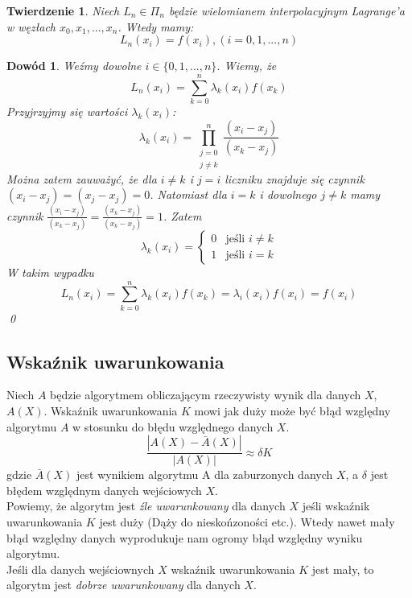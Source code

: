 \documentclass{article}
\newtheorem{twr}{Twierdzenie}
\newtheorem*{dd}{Dowód}
\newcommand{\twopartdef}[4]
{
	\left\{
		\begin{array}{ll}
			#1 & \mbox{jeśli } #2 \\
			#3 & \mbox{jeśli } #4
		\end{array}
	\right.
}
\begin{document}
\begin{twr}
Niech $L_n \in \Pi_n$ będzie wielomianem interpolacyjnym Lagrange'a w węzłach $x_0, x_1, ..., x_n$. Wtedy mamy:
\begin{equation*}
L_n(x_i) = f(x_i) , (i = 0, 1, ..., n)
\end{equation*}
\end{twr}

\begin{dd}
\normalfont
Weźmy dowolne $i \in \{0, 1, ..., n\}$. Wiemy, że
\begin{equation*}
L_n(x_i) = \sum_{k = 0}^n \lambda_k(x_i) f(x_k)
\end{equation*}
Przyjrzyjmy się wartości $\lambda_k(x_i)$:
\begin{equation*}
\lambda_k(x_i) = \prod_{\substack{j = 0 \\ j \neq k}}^n \frac{(x_i - x_j)}{(x_k - x_j)}
\end{equation*}
Można zatem zauważyć, że dla $i \neq k$ i $j = i$ liczniku znajduje się czynnik $(x_i - x_j) = (x_j - x_j) = 0$. Natomiast dla $i = k$ i dowolnego $j \neq k$ mamy czynnik $\frac{(x_i - x_j)}{(x_k - x_j)} = \frac{(x_k - x_j)}{(x_k - x_j)} = 1$. Zatem
\begin{equation*}
\lambda_k(x_i) = \twopartdef {0} {i \neq k} {1} {i = k}
\end{equation*}
W takim wypadku
\begin{equation*}
L_n(x_i) = \sum_{k = 0}^n \lambda_k(x_i) f(x_k) = \lambda_i(x_i) f(x_i) = f(x_i)
\end{equation*}
\qed
\end{dd}

\subsection{Wskaźnik uwarunkowania}
Niech $A$ będzie algorytmem obliczającym rzeczywisty wynik dla danych $X$, $A(X)$. Wskaźnik uwarunkowania $K$ mowi jak duży może być błąd względny algorytmu $A$ w stosunku do błędu względnego danych $X$.
\begin{equation*}
\frac{|A(X) - \bar{A}(X)|}{|A(X)|} \approx \delta K
\end{equation*}
gdzie $\bar{A}(X)$ jest wynikiem algorytmu A dla zaburzonych danych $X$, a $\delta$ jest błędem względnym danych wejściowych $X$.
\\
Powiemy, że algorytm jest \emph{źle uwarunkowany} dla danych $X$ jeśli wskaźnik uwarunkowania $K$ jest duży (Dąży do nieskońzoności etc.). Wtedy nawet mały błąd względny danych wyprodukuje nam ogromy błąd względny wyniku algorytmu.\\
Jeśli dla danych wejściownych $X$ wskaźnik uwarunkowania $K$ jest mały, to algorytm jest \emph{dobrze uwarunkowany} dla danych $X$.
\end{document}
